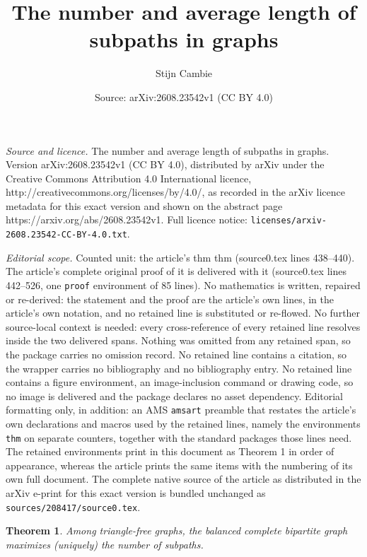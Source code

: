 \documentclass[10pt,a4paper]{amsart}
\title{The number and average length of subpaths in graphs}
\author{Stijn Cambie}
\date{Source: arXiv:2608.23542v1 (CC BY 4.0)}
\newtheorem{thm}{Theorem}
\begin{document}
\maketitle

\noindent\emph{Source and licence.} The number and average length of subpaths in graphs. Version arXiv:2608.23542v1 (CC BY 4.0), distributed by arXiv under the Creative Commons Attribution 4.0 International licence, http://creativecommons.org/licenses/by/4.0/, as recorded in the arXiv licence metadata for this exact version and shown on the abstract page https://arxiv.org/abs/2608.23542v1. Full licence notice: \texttt{licenses/arxiv-2608.23542-CC-BY-4.0.txt}.\par\smallskip

\noindent\textit{Editorial scope.} Counted unit: the article's thm thm (source0.tex lines 438--440). The article's complete original proof of it is delivered with it (source0.tex lines 442--526, one \texttt{proof} environment of 85 lines). No mathematics is written, repaired or re-derived: the statement and the proof are the article's own lines, in the article's own notation, and no retained line is substituted or re-flowed.  No further source-local context is needed: every cross-reference of every retained line resolves inside the two delivered spans.  Nothing was omitted from any retained span, so the package carries no omission record.  No retained line contains a citation, so the wrapper carries no bibliography and no bibliography entry.  No retained line contains a figure environment, an image-inclusion command or drawing code, so no image is delivered and the package declares no asset dependency.  Editorial formatting only, in addition: an AMS \texttt{amsart} preamble that restates the article's own declarations and macros used by the retained lines, namely the environments \texttt{thm} on separate counters, together with the standard packages those lines need.  The retained environments print in this document as Theorem 1 in order of appearance, whereas the article prints the same items with the numbering of its own full document.  The complete native source of the article as distributed in the arXiv e-print for this exact version is bundled unchanged as \texttt{sources/208417/source0.tex}.
\begin{thm}
    Among triangle-free graphs, the balanced complete bipartite graph maximizes (uniquely) the number of subpaths.
\end{thm}
\end{document}
